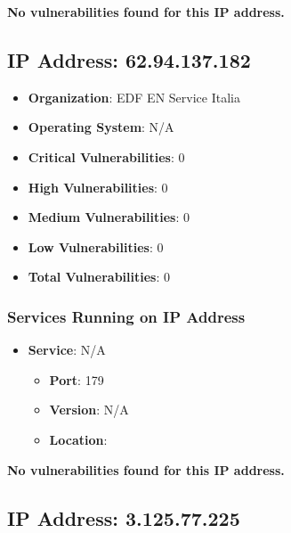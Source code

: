 \documentclass{article}
\begin{document}
\textbf{No vulnerabilities found for this IP address.}




\clearpage



\subsection{IP Address: 62.94.137.182}

\begin{itemize}
    \item \textbf{Organization}: EDF EN Service Italia
    \item \textbf{Operating System}:  N/A 
    \item \textbf{Critical Vulnerabilities}: 0
    \item \textbf{High Vulnerabilities}: 0
    \item \textbf{Medium Vulnerabilities}: 0
    \item \textbf{Low Vulnerabilities}: 0
    \item \textbf{Total Vulnerabilities}: 0
\end{itemize}

\subsubsection*{Services Running on IP Address}

\begin{itemize}
    
        \item \textbf{Service}: N/A
        \begin{itemize}
            \item \textbf{Port}: 179
            \item \textbf{Version}:  N/A 
            \item \textbf{Location}: \href{  }{  }
        \end{itemize}
    
\end{itemize}


\textbf{No vulnerabilities found for this IP address.}




\clearpage



\subsection{IP Address: 3.125.77.225}
\end{document}
